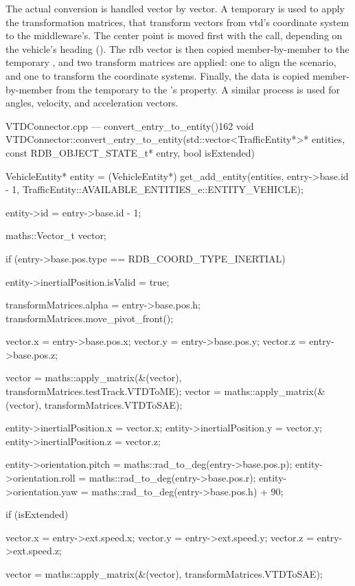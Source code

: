 The actual conversion is handled vector by vector. A temporary  is used to apply the transformation matrices, that transform vectors from \gls{vtd}'s coordinate system to the \gls{middleware}'s. The center point is moved first with the  call, depending on the vehicle's heading (). The \gls{rdb} vector is then copied member-by-member to the temporary , and two transform matrices are applied: one to align the scenario, and one to transform the coordinate systems. Finally, the data is copied member-by-member from the temporary  to the 's  property. A similar process is used for angles, velocity, and acceleration vectors.

\begin{codelist}{VTDConnector.cpp --- convert\_entry\_to\_entity()}{162}
void VTDConnector::convert_entry_to_entity(std::vector<TrafficEntity*>* entities, const RDB_OBJECT_STATE_t* entry, bool isExtended) {
	VehicleEntity* entity = (VehicleEntity*) get_add_entity(entities, entry->base.id - 1, TrafficEntity::AVAILABLE_ENTITIES_e::ENTITY_VEHICLE);

	entity->id = entry->base.id - 1;

	maths::Vector_t vector;

	if (entry->base.pos.type == RDB_COORD_TYPE_INERTIAL) {
		entity->inertialPosition.isValid = true;

		transformMatrices.alpha = entry->base.pos.h;
		transformMatrices.move_pivot_front();

		vector.x = entry->base.pos.x;
		vector.y = entry->base.pos.y;
		vector.z = entry->base.pos.z;

		vector = maths::apply_matrix(&(vector), transformMatrices.testTrack.VTDToME);
		vector = maths::apply_matrix(&(vector), transformMatrices.VTDToSAE);

		entity->inertialPosition.x = vector.x;
		entity->inertialPosition.y = vector.y;
		entity->inertialPosition.z = vector.z;
	}

	entity->orientation.pitch = maths::rad_to_deg(entry->base.pos.p);
	entity->orientation.roll  = maths::rad_to_deg(entry->base.pos.r);
	entity->orientation.yaw   = maths::rad_to_deg(entry->base.pos.h) + 90;

	if (isExtended) {
		vector.x = entry->ext.speed.x;
		vector.y = entry->ext.speed.y;
		vector.z = entry->ext.speed.z;

		vector = maths::apply_matrix(&(vector), transformMatrices.VTDToSAE);

}}
\end{codelist}

